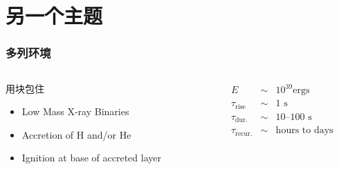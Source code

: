 \documentclass{beamer}
\begin{document}
\section{另一个主题}
\begin{frame}
  \frametitle{多列环境}
  \label{sec-1-2}
  \begin{columns}
    \begin{column}{0.5\textwidth}
      \begin{block}{用块包住}
        \label{sec-1-2-1}

        \begin{itemize}
          \item Low Mass X-ray Binaries
          \item Accretion of H and/or He
          \item Ignition at base of accreted layer
        \end{itemize}
      \end{block}
    \end{column}
    \begin{column}{0.5\textwidth}
      \label{sec-1-2-2}
      \color{yellow}
      \begin{eqnarray*}
        E &\sim& 10^{39} \text{ergs}\\
        \tau_\text{rise} &\sim& 1 \text{ s} \\
        \tau_\text{dur.} &\sim& 10\text{--}100\text{ s} \\
        \tau_\text{recur.} &\sim& \text{hours to days}
      \end{eqnarray*}
    \end{column}
  \end{columns}
\end{frame}
\end{document}
